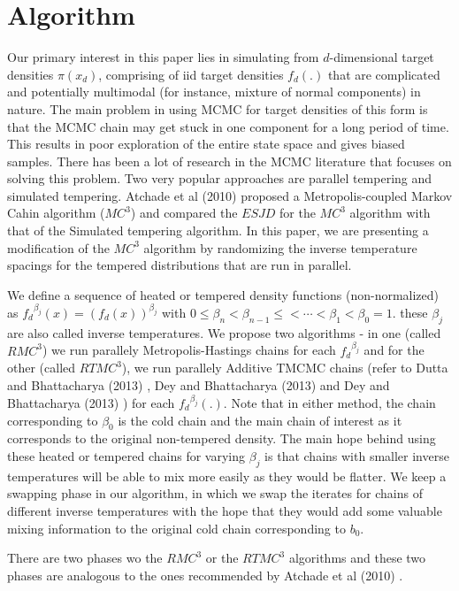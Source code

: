 \documentclass[11pt]{article}
\renewcommand{\b}{\ensuremath{\beta}}
\begin{document}
\section{Algorithm}

Our primary interest in this paper lies in simulating from $d$-dimensional target densities $\pi(x_{d})$, comprising of iid target densities $f_{d}(.)$ that are complicated and potentially multimodal (for instance, mixture of normal components) in nature. The main problem in using MCMC for target densities of this form is that the MCMC chain may get stuck in one component for a long period of time. This results in poor exploration of the entire state space and gives biased samples. There has been a lot of research in the MCMC literature that focuses on solving this problem. Two very popular approaches are parallel tempering and simulated tempering. Atchade et al (2010) \cite{Atchade2010} proposed a Metropolis-coupled Markov Cahin algorithm ($MC^3$) and compared the $ESJD$ for the $MC^3$ algorithm with that of the Simulated tempering algorithm. In this paper, we are presenting a modification of the $MC^3$ algorithm by randomizing the inverse temperature spacings for the tempered distributions that are run in parallel. 

We define a sequence of heated or tempered density functions (non-normalized) as ${f_{d}}^{\b_j}(x) = (f_{d}(x))^{\b_j}$ with $0 \leq \b_n < \b_{n-1} \leq < \cdots < \b_{1} < \b_{0}=1$. these $\b_{j}$ are also called inverse temperatures. We propose two algorithms - in one (called $RMC^3$) we run parallely Metropolis-Hastings chains for each ${f_{d}}^{\b_j}$ and for the other (called $RTMC^3$), we run parallely Additive TMCMC chains (refer to Dutta and Bhattacharya (2013) \cite{Dutta2013}, Dey and Bhattacharya (2013) \cite{Dey2013} and Dey and Bhattacharya (2013) \cite{Dey2013b}) for each ${f_{d}}^{\b_j}(.)$. Note that in either method, the chain corresponding to $\b_0$ is the cold chain and the main chain of interest as it corresponds to the original non-tempered density. The main hope behind using these heated or tempered chains for varying $\b_j$ is that chains with smaller inverse temperatures will be able to mix more easily as they would be flatter. We keep a swapping phase in our algorithm, in which we swap the iterates for chains of different inverse temperatures with the hope that they would add some valuable mixing information to the original cold chain corresponding to $b_0$. 

There are two phases wo the $RMC^3$ or the $RTMC^3$ algorithms and these two phases are analogous to the ones recommended by Atchade et al (2010) \cite{Atchade2010}. 
\end{document}
